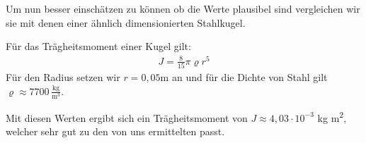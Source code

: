 Um nun besser einschätzen zu können ob die Werte plausibel sind vergleichen wir sie mit denen einer ähnlich dimensionierten Stahlkugel.

Für das Trägheitsmoment einer Kugel gilt:
\begin{align}
    J = \frac{8}{15}\pi\varrho r^5
\end{align}
Für den Radius setzen wir \(r = 0,05\)m an und für die Dichte von Stahl gilt \(\varrho \approx 7700\, \frac{\text{kg}}{\text{m}^3}\).

Mit diesen Werten ergibt sich ein Trägheitsmoment von \(J \approx 4,03 \cdot 10^{-3}\) kg m\textsuperscript{2}, welcher sehr gut zu den von uns ermittelten passt.
